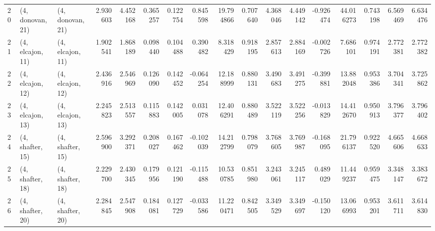 \begin{tabular}{lllrrrrrrrrrrrrrr}
20 &  (4, donovan, 21) &  (4, donovan, 21) &  2.930603 &  4.452168 &   0.365257 &  0.122754 &  0.845598 &  19.794866 &  0.707640 &   4.368046 &  4.449142 & -0.926474 &  44.016273 &  0.743198 &  6.569469 &  6.634476 \\
21 &  (4, elcajon, 11) &  (4, elcajon, 11) &  1.902541 &  1.868189 &   0.098440 &  0.104488 &  0.390482 &   8.318429 &  0.918195 &   2.857613 &  2.884169 & -0.002726 &   7.686101 &  0.974191 &  2.772381 &  2.772382 \\
22 &  (4, elcajon, 12) &  (4, elcajon, 12) &  2.436916 &  2.546969 &   0.126090 &  0.142452 & -0.064254 &  12.188999 &  0.880131 &   3.490683 &  3.491275 & -0.399881 &  13.882048 &  0.953386 &  3.704341 &  3.725862 \\
23 &  (4, elcajon, 13) &  (4, elcajon, 13) &  2.245823 &  2.513557 &   0.115883 &  0.142005 &  0.031078 &  12.406291 &  0.880489 &   3.522119 &  3.522256 & -0.013829 &  14.412670 &  0.950913 &  3.796377 &  3.796402 \\
24 &  (4, shafter, 15) &  (4, shafter, 15) &  2.596900 &  3.292371 &   0.208027 &  0.167462 & -0.102039 &  14.212799 &  0.798079 &   3.768605 &  3.769987 & -0.168095 &  21.796137 &  0.922520 &  4.665606 &  4.668633 \\
25 &  (4, shafter, 18) &  (4, shafter, 18) &  2.229700 &  2.430345 &   0.179956 &  0.121190 & -0.115488 &  10.530785 &  0.851980 &   3.243061 &  3.245117 &  0.489029 &  11.449237 &  0.959475 &  3.348147 &  3.383672 \\
26 &  (4, shafter, 20) &  (4, shafter, 20) &  2.284845 &  2.547908 &   0.184081 &  0.127729 & -0.033586 &  11.220471 &  0.842505 &   3.349529 &  3.349697 & -0.150120 &  13.066993 &  0.953201 &  3.611711 &  3.614830 \\
\bottomrule
\end{tabular}
